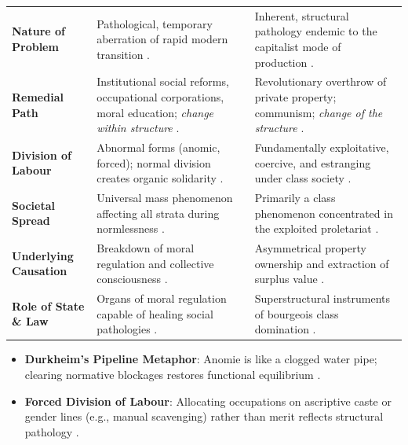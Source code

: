 \begin{table}[htbp]
\centering
\begin{tabularx}{\textwidth}{p{3.2cm} Y Y}
\hline
{}
 &  &  \\
\hline
\textbf{Nature of Problem} & Pathological, temporary aberration of rapid modern transition . & Inherent, structural pathology endemic to the capitalist mode of production . \\
\textbf{Remedial Path} & Institutional social reforms, occupational corporations, moral education; \textit{change within structure} . & Revolutionary overthrow of private property; communism; \textit{change of the structure} . \\
\textbf{Division of Labour} & Abnormal forms (anomic, forced); normal division creates organic solidarity . & Fundamentally exploitative, coercive, and estranging under class society . \\
\textbf{Societal Spread} & Universal mass phenomenon affecting all strata during normlessness . & Primarily a class phenomenon concentrated in the exploited proletariat . \\
\textbf{Underlying Causation} & Breakdown of moral regulation and collective consciousness . & Asymmetrical property ownership and extraction of surplus value . \\
\textbf{Role of State \& Law} & Organs of moral regulation capable of healing social pathologies . & Superstructural instruments of bourgeois class domination . \\
\hline
\end{tabularx}
\end{table}

\begin{ExampleBox}
\begin{itemize}
    \item \textbf{Durkheim's Pipeline Metaphor}: Anomie is like a clogged water pipe; clearing normative blockages restores functional equilibrium .
    \item \textbf{Forced Division of Labour}: Allocating occupations on ascriptive caste or gender lines (e.g., manual scavenging) rather than merit reflects structural pathology .
\end{itemize}
\end{ExampleBox}

